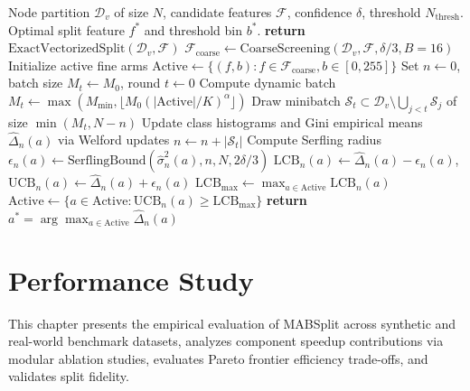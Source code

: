 \documentclass{article}
\begin{document}
	\begin{algorithm}[htbp]
		\caption{MABSplit Node Partitioning via Serfling Bounds and ADMA}
		\label{alg:mabsplit}
		\begin{algorithmic}[1]
			\REQUIRE Node partition $\mathcal{D}_v$ of size $N$, candidate features $\mathcal{F}$, confidence $\delta$, threshold $N_{\text{thresh}}$.
			\ENSURE Optimal split feature $f^*$ and threshold bin $b^*$.
				\STATE \textbf{return} $\text{ExactVectorizedSplit}(\mathcal{D}_v, \mathcal{F})$ 
			\ENDIF
			\STATE $\mathcal{F}_{\text{coarse}} \leftarrow \text{CoarseScreening}(\mathcal{D}_v, \mathcal{F}, \delta/3, B=16)$ 
			\STATE Initialize active fine arms $\text{Active} \leftarrow \{(f, b) : f \in \mathcal{F}_{\text{coarse}}, b \in [0, 255]\}$
			\STATE Set $n \leftarrow 0$, batch size $M_t \leftarrow M_0$, round $t \leftarrow 0$
				\STATE Compute dynamic batch $M_t \leftarrow \max(M_{\min}, \lfloor M_0 (|\text{Active}| / K)^\alpha \rfloor)$
				\STATE Draw minibatch $\mathcal{S}_t \subset \mathcal{D}_v \setminus \bigcup_{j < t} \mathcal{S}_j$ of size $\min(M_t, N - n)$
				\STATE Update class histograms and Gini empirical means $\widehat{\Delta}_n(a)$ via Welford updates
				\STATE $n \leftarrow n + |\mathcal{S}_t|$
					\STATE Compute Serfling radius $\epsilon_n(a) \leftarrow \text{SerflingBound}(\widehat{\sigma}_n^2(a), n, N, 2\delta/3)$
					\STATE $\text{LCB}_n(a) \leftarrow \widehat{\Delta}_n(a) - \epsilon_n(a)$, \quad $\text{UCB}_n(a) \leftarrow \widehat{\Delta}_n(a) + \epsilon_n(a)$
				\ENDFOR
				\STATE $\text{LCB}_{\max} \leftarrow \max_{a \in \text{Active}} \text{LCB}_n(a)$
				\STATE $\text{Active} \leftarrow \{a \in \text{Active} : \text{UCB}_n(a) \ge \text{LCB}_{\max}\}$ 
			\ENDWHILE
			\STATE \textbf{return} $a^* = \arg\max_{a \in \text{Active}} \widehat{\Delta}_n(a)$
		\end{algorithmic}
	\end{algorithm}

	\pagebreak
	
	\section{Performance Study}
	This chapter presents the empirical evaluation of MABSplit across synthetic and real-world benchmark datasets, analyzes component speedup contributions via modular ablation studies, evaluates Pareto frontier efficiency trade-offs, and validates split fidelity.
\end{document}
